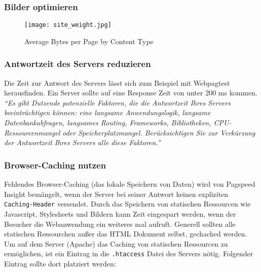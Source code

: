 		\subsubsection{Bilder optimieren} %
		\label{ssub:bilder_optimieren}

		\begin{figure}[htbp]
			\begin{center}
				\texttt{[image: site\_weight.jpg]}
				\caption{Average Bytes per Page by Content Type \autocite{httpArchive}}
				\label{fig:site_weight}
			\end{center}
		\end{figure}
		

		\subsubsection{Antwortzeit des Servers reduzieren} %
		\label{ssub:antwortzeit_des_servers_reduzieren}
			Die Zeit zur Antwort des Servers lässt sich zum Beispiel mit Webpagtest herausfinden. Ein Server sollte auf eine Response Zeit von unter 200 ms kommen. \textit{"`Es gibt Dutzende potenzielle Faktoren, die die Antwortzeit Ihres Servers beeinträchtigen können: eine langsame Anwendungslogik, langsame Datenbankabfragen, langsames Routing, Frameworks, Bibliotheken, CPU-Ressourcenmangel oder Speicherplatzmangel. Berücksichtigen Sie zur Verkürzung der Antwortzeit Ihres Servers alle diese Faktoren."'} \autocite{google15}

		\subsubsection{Browser-Caching nutzen} %
		\label{ssub:browser_caching_nutzen}
			Fehlendes Browser-Caching (das lokale Speichern von Daten) wird von Pagspeed Insight bemängelt, wenn der Server bei seiner Antwort keinen expliziten \texttt{Caching-Header} versendet.
			Durch das Speichern von statischen Ressourcen wie Javascript, Stylesheets und Bildern kann Zeit eingespart werden, wenn der Besucher die Webanwendung ein weiteres mal aufruft. Generell sollten alle statischen Ressourchen außer das HTML Dokument selbst, gechached werden.\\

			Um auf dem Server (Apache) das Caching von statischen Ressourcen zu ermöglichen, ist ein Eintrag in die \texttt{.htaccess} Datei des Servers nötig. Folgender Eintrag sollte dort platziert werden:

